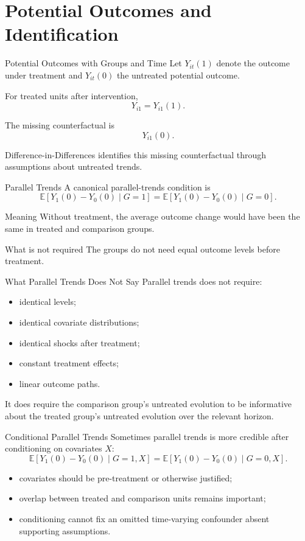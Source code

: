 \documentclass[aspectratio=169,11pt]{beamer}
\newcommand{\E}{\mathbb{E}}
\begin{document}
\section{Potential Outcomes and Identification}

\begin{frame}{Potential Outcomes with Groups and Time}
Let \(Y_{it}(1)\) denote the outcome under treatment and \(Y_{it}(0)\) the untreated potential outcome.

For treated units after intervention,
\[
Y_{i1}=Y_{i1}(1).
\]

The missing counterfactual is
\[
Y_{i1}(0).
\]

Difference-in-Differences identifies this missing counterfactual through assumptions about untreated trends.
\end{frame}

\begin{frame}{Parallel Trends}
A canonical parallel-trends condition is
\[
\E[Y_1(0)-Y_0(0)\mid G=1]
=
\E[Y_1(0)-Y_0(0)\mid G=0].
\]

\begin{block}{Meaning}
Without treatment, the average outcome change would have been the same in treated and comparison groups.
\end{block}

\begin{alertblock}{What is not required}
The groups do not need equal outcome levels before treatment.
\end{alertblock}
\end{frame}

\begin{frame}{What Parallel Trends Does Not Say}
Parallel trends does not require:
\begin{itemize}
\item identical levels;
\item identical covariate distributions;
\item identical shocks after treatment;
\item constant treatment effects;
\item linear outcome paths.
\end{itemize}

It does require the comparison group's untreated evolution to be informative about the treated group's untreated evolution over the relevant horizon.
\end{frame}

\begin{frame}{Conditional Parallel Trends}
Sometimes parallel trends is more credible after conditioning on covariates \(X\):
\[
\E[Y_1(0)-Y_0(0)\mid G=1,X]
=
\E[Y_1(0)-Y_0(0)\mid G=0,X].
\]

\begin{itemize}
\item covariates should be pre-treatment or otherwise justified;
\item overlap between treated and comparison units remains important;
\item conditioning cannot fix an omitted time-varying confounder absent supporting assumptions.
\end{itemize}
\end{frame}
\end{document}
